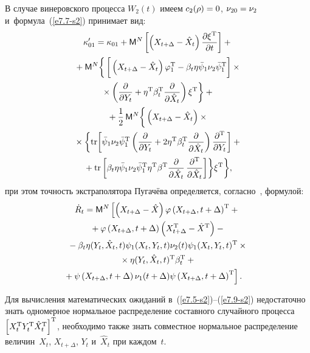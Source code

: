 \begin{multicols}{2}
В случае винеровского процесса  $W_2(t)$ имеем $c_2(\rho)\hm =0$,
$\nu_{20}\hm=\nu_2$ и~формула~(\ref{e7.7-s2}) принимает вид:
 \begin{multline*}
 \kappa_{01}' = \kappa_{01} + \mm^N\left[ \left(X_{t+\Delta}- \hat X_t\right) 
 \fr{\partial \xi^{\mathrm{T}}}{\partial t} \right]+{}\\
    {}+ \mm^N\bigg\{\left[
    \vphantom{\fr{\partial^{\mathrm{T}}} {\partial \hat X_t}}
     \left(X_{t+\Delta}-\hat X_t\right)  \varphi_1^{\mathrm{T}} - 
    \beta_t\eta\bar\psi_1\nu_{2}\bar\psi_1^{\mathrm{T}}\right]\times{}\\
    {}\times
    \left(\fr{\partial}{\partial Y_t} + \eta^{\mathrm{T}} \beta_t^{\mathrm{T}} 
    \fr{\partial}{\partial \hat X_t}\right)\xi^{\mathrm{T}}\bigg\}+{}\\
{} + \fr{1}{2}\, \mm^N\bigg\{ \left(X_{t+\Delta} - \hat X_t\right) \times{}\\
{}\times
\biggl\{ \mathrm{tr}\biggl[ 
\bar\psi_1 \nu_{2} \bar\psi_1^{\mathrm{T}}
    \left(\fr{\partial }{\partial Y_t} + 
    2\eta^{\mathrm{T}} \beta_t^{\mathrm{T}} \fr{\partial}{\partial \hat X_t}\right)
    \fr{\partial^{\mathrm{T}}}{\partial Y_t}\biggr]+{}\\
{}+\mathrm{tr}\left[ \beta_t\eta \bar\psi_1 \nu_{2} \bar\psi_1^{\mathrm{T}}
\eta^{\mathrm{T}}\beta^{\mathrm{T}}
    \fr{\partial}{\partial \hat X_t}\,  \fr{\partial^{\mathrm{T}}}
    {\partial \hat X_t}\right]\biggr\}\xi^{\mathrm{T}}\biggr\},
    \end{multline*}
при этом точность экстраполятора Пугачёва определяется, согласно~\cite{3-s2}, формулой:
 \begin{multline}
 \dot R_t = \mm^N
 \left[\left( X_{t+\Delta} -\hx\right) \varphi 
 \left(X_{t+\Delta}, t+\Delta\right)^{\mathrm{T}} +{}\right.\\
 {}+\varphi\left(X_{t+\Delta}, t+\Delta\right) 
 \left(X_{t+\Delta}^{\mathrm{T}} -\hx^{\mathrm{T}}\right)-{}\\
{}-\beta_t\eta \yutt \psi_1 \yxtt \nu_2(t) \psi_1\yxtt^{\mathrm{T}}\times{}\\ 
{}\times\eta \yutt^{\mathrm{T}} \beta_t^{\mathrm{T}} +{}\\
\hspace*{-5mm}\left.{}+\psi \left(X_{t+\Delta}, t+\Delta\right) 
 \nu_1(t+\Delta) \psi \left(X_{t+\Delta}, t+\Delta\right)^{\mathrm{T}}
 \right].\!
 \label{e7.9-s2}
 \end{multline}

Для вычисления математических ожиданий в~(\ref{e7.5-s2})--(\ref{e7.9-s2}) 
недостаточно знать
одномерное нормальное распределение составного случайного процесса  $\left[
X_t^{\mathrm{T}} Y_t^{\mathrm{T}}  \hat X_t^{\mathrm{T}}\right]^{\mathrm{T}}$, необходимо также знать совместное нормальное
распределение величин~$ X_t$,  $X_{t+\Delta}$, $Y_t$ и~$\hat X_t$ при каждом~$t$.



\end{multicols}
